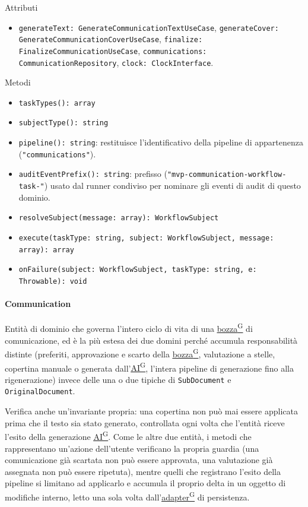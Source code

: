 \documentclass[a4paper,12pt]{article}
\providecommand{\glslink}[2]{\href{https://alittlebyte-19.github.io/Documentazione/glossario.html\#gls-#1}{\underline{#2}\textsuperscript{\scriptsize G}}}
\begin{document}
\begin{sloppypar}
Attributi
\begin{itemize}\raggedright
    \item \texttt{generateText: GenerateCommunicationTextUseCase}, \texttt{generateCover: GenerateCommunicationCoverUseCase}, \texttt{finalize: FinalizeCommunicationUseCase}, \texttt{communications: CommunicationRepository}, \texttt{clock: ClockInterface}.
\end{itemize}

Metodi
\begin{itemize}\raggedright
    \item \texttt{taskTypes(): array}
    \item \texttt{subjectType(): string}
    \item \texttt{pipeline(): string}: restituisce l'identificativo della pipeline di appartenenza (\texttt{"communications"}).
    \item \texttt{auditEventPrefix(): string}: prefisso (\texttt{"mvp-communication-workflow-task-"}) usato dal runner condiviso per nominare gli eventi di audit di questo dominio.
    \item \texttt{resolveSubject(message: array): WorkflowSubject}
    \item \texttt{execute(taskType: string, subject: WorkflowSubject, message: array): array}
    \item \texttt{onFailure(subject: WorkflowSubject, taskType: string, e: Throwable): void}
\end{itemize}

\paragraph{Communication}

Entità di dominio che governa l'intero ciclo di vita di una \glslink{bozza-draft}{bozza} di comunicazione, ed è la più estesa dei due domini perché accumula responsabilità distinte (preferiti, approvazione e scarto della \glslink{bozza-draft}{bozza}, valutazione a stelle, copertina manuale o generata dall'\glslink{intelligenza-artificiale-ai}{AI}, l'intera pipeline di generazione fino alla rigenerazione) invece delle una o due tipiche di \texttt{SubDocument} e \texttt{OriginalDocument}.

Verifica anche un'invariante propria: una copertina non può mai essere applicata prima che il testo sia stato generato, controllata ogni volta che l'entità riceve l'esito della generazione \glslink{intelligenza-artificiale-ai}{AI}. Come le altre due entità, i metodi che rappresentano un'azione dell'utente verificano la propria guardia (una comunicazione già scartata non può essere approvata, una valutazione già assegnata non può essere ripetuta), mentre quelli che registrano l'esito della pipeline si limitano ad applicarlo e accumula il proprio delta in un oggetto di modifiche interno, letto una sola volta dall'\glslink{adapter}{adapter} di persistenza.


\end{sloppypar}
\end{document}
